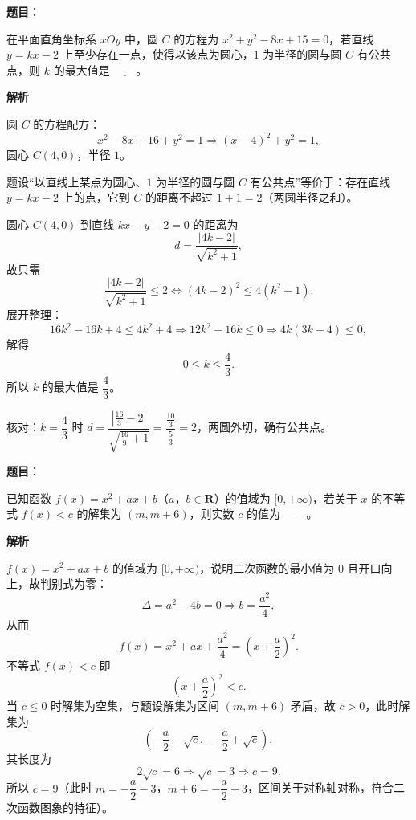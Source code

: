 \begin{answer}

\textbf{题目}：

在平面直角坐标系 $xOy$ 中，圆 $C$ 的方程为 $x^2+y^2-8x+15=0$，若直线 $y=kx-2$ 上至少存在一点，使得以该点为圆心，$1$ 为半径的圆与圆 $C$ 有公共点，则 $k$ 的最大值是 $\underline{\qquad}$。

\textbf{解析}

圆 $C$ 的方程配方：
\nopagebreak[4]
\[x^2-8x+16+y^2=1\Longrightarrow(x-4)^2+y^2=1,\]
圆心 $C(4,0)$，半径 $1$。

题设“以直线上某点为圆心、$1$ 为半径的圆与圆 $C$ 有公共点”等价于：存在直线 $y=kx-2$ 上的点，它到 $C$ 的距离不超过 $1+1=2$（两圆半径之和）。

圆心 $C(4,0)$ 到直线 $kx-y-2=0$ 的距离为
\nopagebreak[4]
\[d=\frac{|4k-2|}{\sqrt{k^2+1}},\]
故只需
\nopagebreak[4]
\[\frac{|4k-2|}{\sqrt{k^2+1}}\leqslant2\Longleftrightarrow(4k-2)^2\leqslant4(k^2+1).\]
展开整理：
\nopagebreak[4]
\[16k^2-16k+4\leqslant4k^2+4\Longrightarrow12k^2-16k\leqslant0\Longrightarrow4k(3k-4)\leqslant0,\]
解得
\nopagebreak[4]
\[0\leqslant k\leqslant\frac43.\]
所以 $k$ 的最大值是 $\dfrac43$。

核对：$k=\dfrac43$ 时 $d=\dfrac{\left|\frac{16}{3}-2\right|}{\sqrt{\frac{16}9+1}}=\dfrac{\frac{10}3}{\frac53}=2$，两圆外切，确有公共点。


\end{answer}
\begin{answer}

\textbf{题目}：

已知函数 $f(x)=x^2+ax+b$（$a$，$b\in\mathbf R$）的值域为 $[0,+\infty)$，若关于 $x$ 的不等式 $f(x)<c$ 的解集为 $(m,m+6)$，则实数 $c$ 的值为 $\underline{\qquad}$。

\textbf{解析}

$f(x)=x^2+ax+b$ 的值域为 $[0,+\infty)$，说明二次函数的最小值为 $0$ 且开口向上，故判别式为零：
\nopagebreak[4]
\[\Delta=a^2-4b=0\Longrightarrow b=\frac{a^2}{4},\]
从而
\nopagebreak[4]
\[f(x)=x^2+ax+\frac{a^2}{4}=\left(x+\frac a2\right)^2.\]
不等式 $f(x)<c$ 即
\nopagebreak[4]
\[\left(x+\frac a2\right)^2<c.\]
当 $c\leqslant0$ 时解集为空集，与题设解集为区间 $(m,m+6)$ 矛盾，故 $c>0$，此时解集为
\nopagebreak[4]
\[\left(-\frac a2-\sqrt c,\ -\frac a2+\sqrt c\right),\]
其长度为
\nopagebreak[4]
\[2\sqrt c=6\Longrightarrow\sqrt c=3\Longrightarrow c=9.\]
所以 $c=9$（此时 $m=-\dfrac a2-3$，$m+6=-\dfrac a2+3$，区间关于对称轴对称，符合二次函数图象的特征）。

\gkanswer{答案：$9$。值域为 $[0,+\infty)$ 给出 $b=\dfrac{a^2}4$，故 $f(x)=\left(x+\dfrac a2\right)^2$，解集长度为 $2\sqrt c=6$。}

\end{answer}
